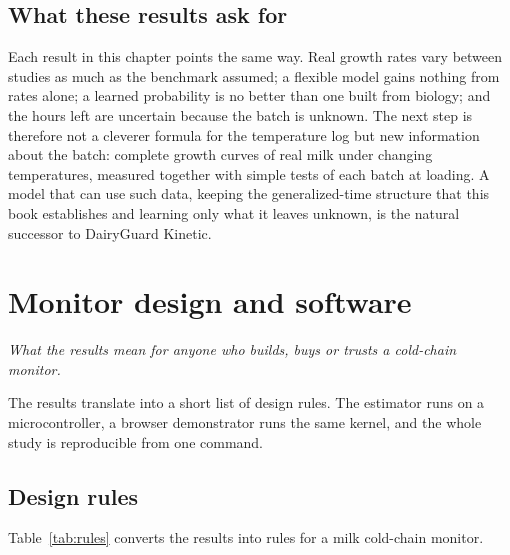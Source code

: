 \documentclass[11pt,a4paper,twoside,openany]{book}
\newcommand{\hook}[1]{{\noindent\fontsize{14}{20}\selectfont\itshape\color{dggrey}#1\par}\vspace{14pt}}
\theoremstyle{plain}\newtheorem{proposition}{Proposition}\newtheorem{corollary}{Corollary}
\theoremstyle{definition}\newtheorem{definition}{Definition}[chapter]
\begin{document}
\section{What these results ask for}
Each result in this chapter points the same way. Real growth rates vary between studies as much as the benchmark assumed; a flexible model gains nothing from rates alone; a learned probability is no better than one built from biology; and the hours left are uncertain because the batch is unknown. The next step is therefore not a cleverer formula for the temperature log but new information about the batch: complete growth curves of real milk under changing temperatures, measured together with simple tests of each batch at loading. A model that can use such data, keeping the generalized-time structure that this book establishes and learning only what it leaves unknown, is the natural successor to DairyGuard Kinetic.

\chapter{Monitor design and software}\label{ch:design}
\hook{What the results mean for anyone who builds, buys or trusts a cold-chain monitor.}
\begin{summary}
The results translate into a short list of design rules. The estimator runs on a microcontroller, a browser demonstrator runs the same kernel, and the whole study is reproducible from one command.
\end{summary}
\section{Design rules}
Table~\ref{tab:rules} converts the results into rules for a milk cold-chain monitor.
\end{document}

